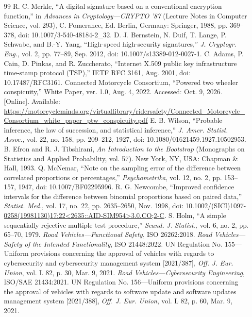 \begin{thebibliography}{99}
 R. C. Merkle, ``A digital signature based on a conventional encryption function,'' in \emph{Advances in Cryptology---CRYPTO '87} (Lecture Notes in Computer Science, vol. 293), C. Pomerance, Ed. Berlin, Germany: Springer, 1988, pp. 369--378, doi: 10.1007/3-540-48184-2\_32.
 D. J. Bernstein, N. Duif, T. Lange, P. Schwabe, and B.-Y. Yang, ``High-speed high-security signatures,'' \emph{J. Cryptogr. Eng.}, vol. 2, pp. 77--89, Sep. 2012, doi: 10.1007/s13389-012-0027-1.
 C. Adams, P. Cain, D. Pinkas, and R. Zuccherato, ``Internet X.509 public key infrastructure time-stamp protocol (TSP),'' IETF RFC 3161, Aug. 2001, doi: 10.17487/RFC3161.
 Connected Motorcycle Consortium, ``Powered two wheeler conspicuity,'' White Paper, ver. 1.0, Aug. 4, 2022. Accessed: Oct. 9, 2026. [Online]. Available: \url{https://motorcycleminds.org/virtuallibrary/ridersafety/Connected_Motorcycle_Consortium_white_paper_ptw_conspicuity.pdf}
 E. B. Wilson, ``Probable inference, the law of succession, and statistical inference,'' \emph{J. Amer. Statist. Assoc.}, vol. 22, no. 158, pp. 209--212, 1927, doi: 10.1080/01621459.1927.10502953.
 B. Efron and R. J. Tibshirani, \emph{An Introduction to the Bootstrap} (Monographs on Statistics and Applied Probability, vol. 57). New York, NY, USA: Chapman \& Hall, 1993.
 Q. McNemar, ``Note on the sampling error of the difference between correlated proportions or percentages,'' \emph{Psychometrika}, vol. 12, no. 2, pp. 153--157, 1947, doi: 10.1007/BF02295996.
 R. G. Newcombe, ``Improved confidence intervals for the difference between binomial proportions based on paired data,'' \emph{Statist. Med.}, vol. 17, no. 22, pp. 2635--2650, Nov. 1998, doi: \url{10.1002/(SICI)1097-0258(19981130)17:22<2635::AID-SIM954>3.0.CO;2-C}.
 S. Holm, ``A simple sequentially rejective multiple test procedure,'' \emph{Scand. J. Statist.}, vol. 6, no. 2, pp. 65--70, 1979.
 \emph{Road Vehicles---Functional Safety}, ISO 26262:2018.
 \emph{Road Vehicles---Safety of the Intended Functionality}, ISO 21448:2022.
 UN Regulation No. 155---Uniform provisions concerning the approval of vehicles with regards to cybersecurity and cybersecurity management system [2021/387], \emph{Off. J. Eur. Union}, vol. L 82, p. 30, Mar. 9, 2021.
 \emph{Road Vehicles---Cybersecurity Engineering}, ISO/SAE 21434:2021.
 UN Regulation No. 156---Uniform provisions concerning the approval of vehicles with regards to software update and software updates management system [2021/388], \emph{Off. J. Eur. Union}, vol. L 82, p. 60, Mar. 9, 2021.

\end{thebibliography}
